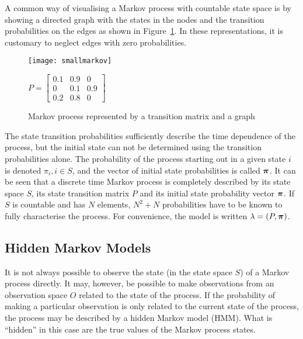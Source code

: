 A common way of visualising a Markov process with countable state
space is by showing a directed graph with the states in the nodes and
the transition probabilities on the edges as shown in
Figure~\ref{fig:markovgraph}. In these representations, it is
customary to neglect edges with zero probabilities.

\begin{figure}[htbp]
  \centering
  \begin{minipage}{0.4\textwidth}
    \texttt{[image: smallmarkov]}
  \end{minipage}
  \begin{minipage}{0.4\textwidth}
   $\displaystyle P = \left [ 
      \begin{array}{ccc} 
        0.1 & 0.9 & 0 \\ 
        0 & 0.1 & 0.9 \\ 
        0.2 & 0.8 & 0 
      \end{array} \right ]$
  \end{minipage}
  \caption{Markov process represented by a transition matrix and a graph}
  \label{fig:markovgraph}
\end{figure}

The state transition probabilities sufficiently describe the time
dependence of the process, but the initial state can not be determined
using the transition probabilities alone.  The probability of the
process starting out in a given state $i$ is denoted $\pi_i, i \in S$,
and the vector of initial state probabilities is called
$\boldsymbol{\pi}$. It can be seen that a discrete time Markov process
is completely described by its state space $S$, its state transition matrix
$P$ and its initial state probability vector $\boldsymbol{\pi}$.  If
$S$ is countable and has $N$ elements, $N^2 + N$ probabilities have to
be known to fully characterise the process.  For convenience, the
model is written $\lambda = (P, \boldsymbol{\pi})$.

\subsection{Hidden Markov Models} 
It is not always possible to observe the state (in the state space
$S$) of a Markov process directly. It may, however, be possible to
make observations from an observation space $O$ related to the state
of the process. If the probability of making a particular observation
is only related to the current state of the process, the process may
be described by a hidden Markov model (HMM). What is ``hidden'' in
this case are the true values of the Markov process states.

